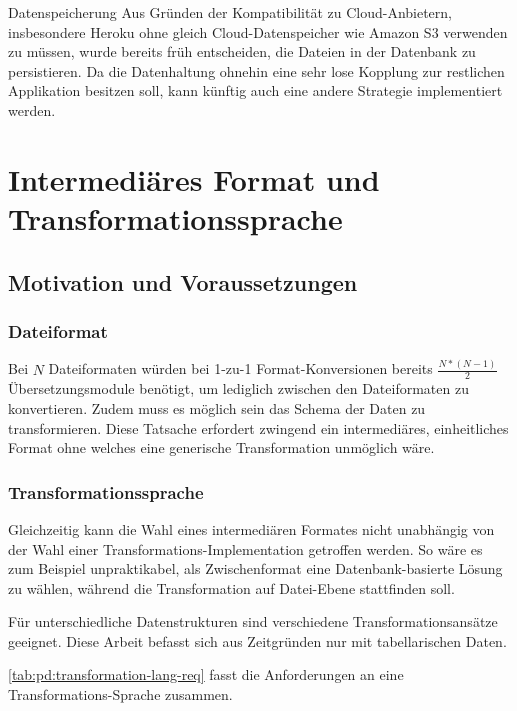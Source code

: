 \begin{decision}[label=dec:pd:datenspeicherung]{Datenspeicherung}
Aus Gründen der Kompatibilität zu Cloud-Anbietern, insbesondere Heroku ohne gleich Cloud-Datenspeicher wie Amazon S3 verwenden zu müssen, wurde bereits früh entscheiden, die Dateien in der Datenbank zu persistieren. Da die Datenhaltung ohnehin eine sehr lose Kopplung zur restlichen Applikation besitzen soll, kann künftig auch eine andere Strategie implementiert werden.
\end{decision}

\section{Intermediäres Format und Transformationssprache}

\subsection{Motivation und Voraussetzungen}

\subsubsection{Dateiformat}
Bei $N$ Dateiformaten würden bei 1-zu-1 Format-Konversionen bereits $\frac{N*(N-1)}2$ Übersetzungsmodule benötigt, um lediglich zwischen den Dateiformaten zu konvertieren. Zudem muss es möglich sein das Schema der Daten zu transformieren. Diese Tatsache erfordert zwingend ein intermediäres, einheitliches Format ohne welches eine generische Transformation unmöglich wäre.

\subsubsection{Transformationssprache}
Gleichzeitig kann die Wahl eines intermediären Formates nicht unabhängig von der Wahl einer Transformations-Implementation getroffen werden. So wäre es zum Beispiel unpraktikabel, als Zwischenformat eine Datenbank-basierte Lösung zu wählen, während die Transformation auf Datei-Ebene stattfinden soll.

Für unterschiedliche Datenstrukturen sind verschiedene Transformationsansätze geeignet. Diese Arbeit befasst sich aus Zeitgründen nur mit tabellarischen Daten. 

\cref{tab:pd:transformation-lang-req} fasst die Anforderungen an eine Transformations-Sprache zusammen.

